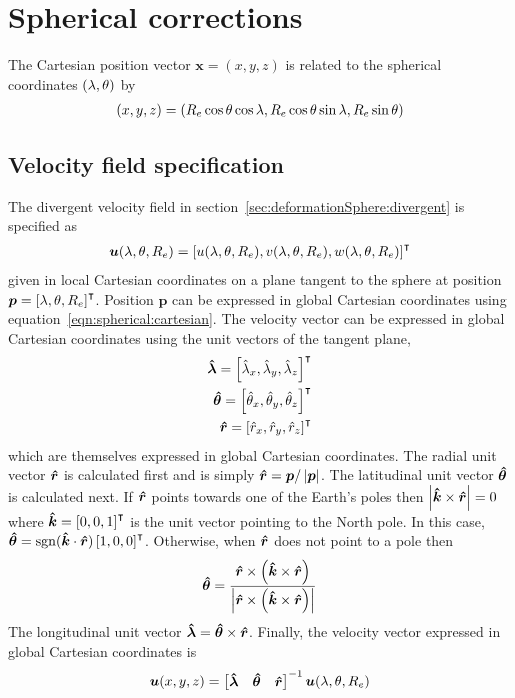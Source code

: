 \section{Spherical corrections}
The Cartesian position vector $\bm{x} = (x,y,z)$ is related to the spherical coordinates $(\lambda, \theta)$ by
\begin{align}
	(x,y,z) = (R_e \cos \theta \cos \lambda, R_e \cos \theta \sin \lambda, R_e \sin \theta) \label{eqn:spherical:cartesian}
\end{align}

\subsection{Velocity field specification}
The divergent velocity field in section~\ref{sec:deformationSphere:divergent} is specified as
\begin{align}
	\bm{u}(\lambda, \theta, R_e) = \left[ 
	u(\lambda, \theta, R_e),
	v(\lambda, \theta, R_e),
	w(\lambda, \theta, R_e)
	\right]^\intercal
\end{align}
given in local Cartesian coordinates on a plane tangent to the sphere at position $\bm{p} = \left[ \lambda, \theta, R_e \right]^\intercal$.  Position $\bm{p}$ can be expressed in global Cartesian coordinates using equation~\eqref{eqn:spherical:cartesian}.
The velocity vector can be expressed in global Cartesian coordinates using the unit vectors of the tangent plane,
\begin{align}
	\bm{\hat{\lambda}} = \left[ \hat{\lambda}_x, \hat{\lambda}_y, \hat{\lambda}_z \right]^\intercal \\
	\bm{\hat{\theta}} = \left[ \hat{\theta}_x, \hat{\theta}_y, \hat{\theta}_z \right]^\intercal \\
	\bm{\hat{r}} = \left[ \hat{r}_x, \hat{r}_y, \hat{r}_z \right]^\intercal
\end{align}
which are themselves expressed in global Cartesian coordinates.
The radial unit vector $\bm{\hat{r}}$ is calculated first and is simply $\bm{\hat{r}} = \bm{p} / \left\lvert \bm{p} \right\rvert$.
The latitudinal unit vector $\bm{\hat{\theta}}$ is calculated next.  If $\bm{\hat{r}}$ points towards one of the Earth's poles then $\left\lvert \bm{\hat{k}} \times \bm{\hat{r}} \right\rvert = 0$ where $\bm{\hat{k}} = \left[0, 0, 1\right]^\intercal$ is the unit vector pointing to the North pole.
In this case, $\bm{\hat{\theta}} = \mathrm{sgn}(\bm{\hat{k}} \cdot \bm{\hat{r}}) \left[1, 0, 0\right]^\intercal$.  Otherwise, when $\bm{\hat{r}}$ does not point to a pole then
\begin{align}
	\bm{\hat{\theta}} = \frac{\bm{\hat{r}} \times \left( \bm{\hat{k}} \times \bm{\hat{r}} \right)}{\left\lvert \bm{\hat{r}} \times \left( \bm{\hat{k}} \times \bm{\hat{r}} \right) \right\rvert}
\end{align}
The longitudinal unit vector $\bm{\hat{\lambda}} = \bm{\hat{\theta}} \times \bm{\hat{r}}$.
Finally, the velocity vector expressed in global Cartesian coordinates is
\begin{align}
	\bm{u}(x, y, z) = 
	\begin{bmatrix}
		\bm{\hat{\lambda}} &
		\bm{\hat{\theta}} &
		\bm{\hat{r}}
	\end{bmatrix}^{-1}
	\bm{u}(\lambda, \theta, R_e)
\end{align}

